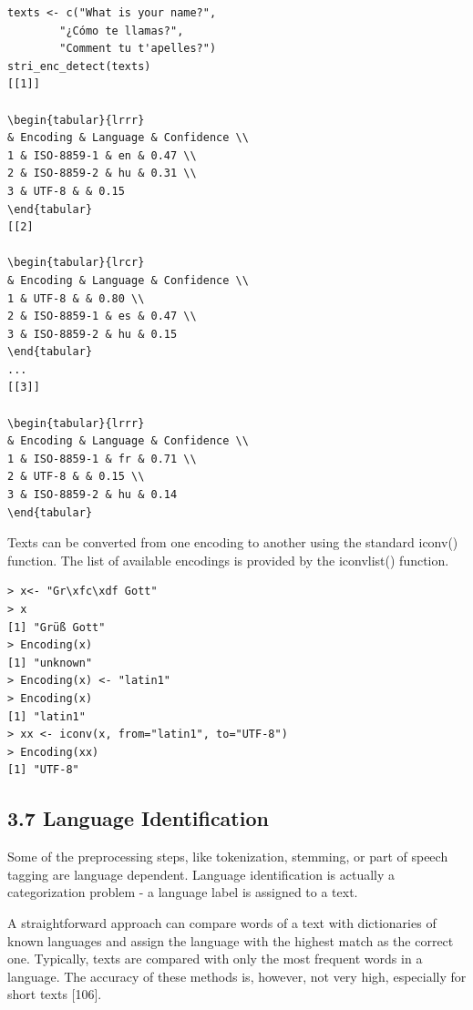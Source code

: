 \documentclass[10pt]{book}
\begin{document}
\begin{verbatim}
texts <- c("What is your name?",
        "¿Cómo te llamas?",
        "Comment tu t'apelles?")
stri_enc_detect(texts)
[[1]]

\begin{tabular}{lrrr} 
& Encoding & Language & Confidence \\
1 & ISO-8859-1 & en & 0.47 \\
2 & ISO-8859-2 & hu & 0.31 \\
3 & UTF-8 & & 0.15
\end{tabular}
[[2]

\begin{tabular}{lrcr} 
& Encoding & Language & Confidence \\
1 & UTF-8 & & 0.80 \\
2 & ISO-8859-1 & es & 0.47 \\
3 & ISO-8859-2 & hu & 0.15
\end{tabular}
...
[[3]]

\begin{tabular}{lrrr} 
& Encoding & Language & Confidence \\
1 & ISO-8859-1 & fr & 0.71 \\
2 & UTF-8 & & 0.15 \\
3 & ISO-8859-2 & hu & 0.14
\end{tabular}
\end{verbatim}

Texts can be converted from one encoding to another using the standard iconv() function. The list of available encodings is provided by the iconvlist() function.

\begin{verbatim}
> x<- "Gr\xfc\xdf Gott"
> x
[1] "Grüß Gott"
> Encoding(x)
[1] "unknown"
> Encoding(x) <- "latin1"
> Encoding(x)
[1] "latin1"
> xx <- iconv(x, from="latin1", to="UTF-8")
> Encoding(xx)
[1] "UTF-8"
\end{verbatim}

\subsection*{3.7 Language Identification}
Some of the preprocessing steps, like tokenization, stemming, or part of speech tagging are language dependent. Language identification is actually a categorization problem - a language label is assigned to a text.

A straightforward approach can compare words of a text with dictionaries of known languages and assign the language with the highest match as the correct one. Typically, texts are compared with only the most frequent words in a language. The accuracy of these methods is, however, not very high, especially for short texts [106].
\end{document}
